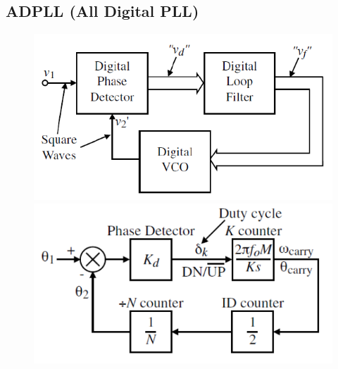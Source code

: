 \subsection{ADPLL (All Digital PLL)}
\begin{figure}[h!]
	\begin{minipage}{0.45\textwidth} 
       \includegraphics[width=1\textwidth]{images/ADPLL}
	\end{minipage}
	\begin{minipage}{0.45\textwidth} 
       \includegraphics[width=1.1\textwidth]{images/linear_ADPLL}
	\end{minipage}
\end{figure}

